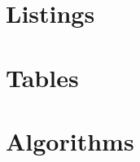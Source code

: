 \documentclass[11pt,a4paper,twoside,titlepage,openany]{book}
\begin{document}
\section*{Listings}
\lstlistoflistings
\section*{Tables}
\listoftables
\section*{Algorithms}
\listofalgorithms






\end{document}
